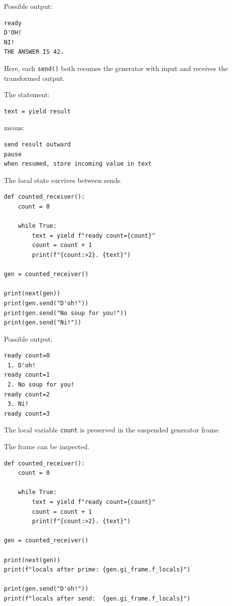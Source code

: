 Possible output:

\begin{verbatim}
ready
D'OH!
NI!
THE ANSWER IS 42.
\end{verbatim}

Here, each \texttt{send()} both resumes the generator with input and receives the transformed output.

The statement:

\begin{verbatim}
text = yield result
\end{verbatim}

means:

\begin{verbatim}
send result outward
pause
when resumed, store incoming value in text
\end{verbatim}

The local state survives between sends.

\begin{verbatim}
def counted_receiver():
    count = 0

    while True:
        text = yield f"ready count={count}"
        count = count + 1
        print(f"{count:>2}. {text}")

gen = counted_receiver()

print(next(gen))
print(gen.send("D'oh!"))
print(gen.send("No soup for you!"))
print(gen.send("Ni!"))
\end{verbatim}

Possible output:

\begin{verbatim}
ready count=0
 1. D'oh!
ready count=1
 2. No soup for you!
ready count=2
 3. Ni!
ready count=3
\end{verbatim}

The local variable \texttt{count} is preserved in the suspended generator frame.

The frame can be inspected.

\begin{verbatim}
def counted_receiver():
    count = 0

    while True:
        text = yield f"ready count={count}"
        count = count + 1
        print(f"{count:>2}. {text}")

gen = counted_receiver()

print(next(gen))
print(f"locals after prime: {gen.gi_frame.f_locals}")

print(gen.send("D'oh!"))
print(f"locals after send:  {gen.gi_frame.f_locals}")
\end{verbatim}


